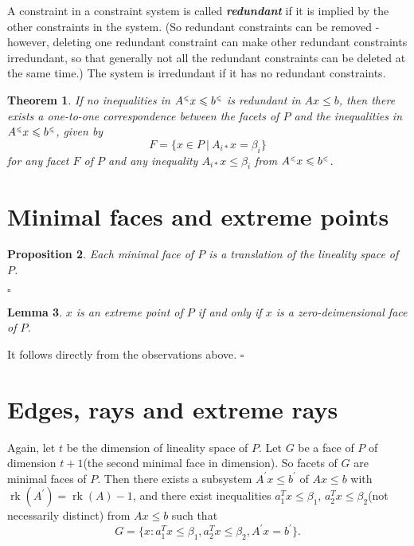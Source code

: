 \documentclass{article}
\newcounter{lecnum}
\DeclareMathOperator{\rk}{rk}
\newcommand{\tleq}{{\mbox{\tiny $\leqslant$}}}
\newtheorem{theorem}{Theorem}[lecnum]
\newtheorem{lemma}[theorem]{Lemma}
\newtheorem{proposition}[theorem]{Proposition}
\newenvironment{proof}{{\it Proof.}}{ \hfill $\square$}
\begin{document}
A constraint in a constraint system is called \emph{\textbf{redundant}} if it is implied by the other constraints in the system. (So redundant constraints can be removed - however, deleting one redundant constraint can make other redundant constraints irredundant, so that generally  not all the redundant  constraints can be deleted at the same time.) The system is irredundant if it has no redundant constraints.

\begin{theorem}
If no inequalities in $A^\tleq x\leqslant b^\tleq$ is redundant in $Ax\leqslant b$, then there exists a one-to-one correspondence between the facets of $P$ and the inequalities in $A^\tleq x\leqslant b^\tleq$, given by
\begin{equation}
F=\{x\in P~|~A_{i*} x=\beta_i\}
\end{equation}
for any facet $F$ of $P$ and any inequality $A_{i*} x\leqslant \beta_i$ from $A^\tleq x\leqslant b^\tleq$.
\end{theorem}

\section{Minimal faces and extreme points}

\begin{proposition}
Each minimal face of $P$ is a translation of the lineality space of $P$.
\end{proposition}
\begin{proof}
\end{proof}


\begin{lemma}
$x$ is an extreme point of $P$ if and only if $x$ is a zero-deimensional face of $P$.
\end{lemma}
\begin{proof}
It follows directly from the observations above.
\end{proof}

\section{Edges, rays and extreme rays}
Again, let $t$ be the dimension of lineality space of $P$. Let $G$ be a face of $P$ of dimension $t+1$(the second minimal face in dimension). So facets of $G$ are minimal faces of $P$. Then there exists a subsystem $A^\prime x\leqslant b^\prime$ of $Ax\leqslant b$ with $\rk(A^\prime)=\rk(A)-1$, and there exist inequalities $a_1^T x\leqslant \beta_1$, $a_2^T x\leqslant \beta_2$(not necessarily distinct) from $Ax\leqslant b$ such that
$$G=\{x:a_1^T x\leqslant \beta_1, a_2^T x\leqslant \beta_2, A^\prime x=b^\prime\}.$$
\end{document}
